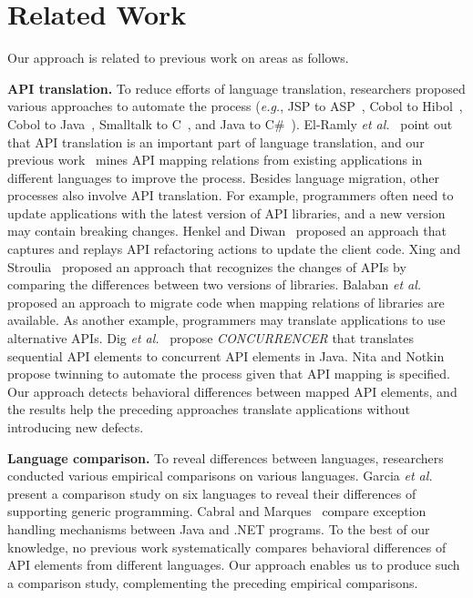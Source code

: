 \section{Related Work}
\label{sec:related}

Our approach is related to previous work on areas as follows.

\textbf{API translation.} To reduce efforts of language translation, researchers proposed various
approaches to automate the process (\emph{e.g.}, JSP to ASP~\cite{hassan2005lightweight}, Cobol to Hibol~\cite{waters1988program}, Cobol to Java~\cite{mossienko2003automated}, Smalltalk to C~\cite{yasumatsu1995spice}, and Java to C\#~\cite{el2006experiment}). El-Ramly \emph{et al.}~\cite{el2006experiment} point out that API translation is an important part of language translation, and our previous work~\cite{zhong2010mining} mines API mapping relations from existing applications in different languages to improve the process. Besides language migration, other processes also involve API translation. For example, programmers often need to update applications with the latest version of API libraries, and a new version may contain breaking changes. Henkel and Diwan~\cite{henkel2005catchup} proposed an approach that captures and replays API refactoring actions to update the client code. Xing and Stroulia~\cite{xing2007api} proposed an approach that recognizes the changes of APIs by comparing the differences between two versions of libraries. Balaban \emph{et al.}~\cite{balaban2005refactoring} proposed an approach to migrate code when mapping relations of libraries are available. As another example, programmers may translate applications to use alternative APIs. Dig \emph{et al.}~\cite{dig2009refactoring} propose \emph{CONCURRENCER} that translates sequential API elements to concurrent API elements in Java. Nita and Notkin~\cite{nita2010using} propose twinning to automate the process given that API mapping is specified. Our approach detects behavioral differences between mapped API elements, and the results help the preceding approaches translate applications without introducing new defects.

\textbf{Language comparison.} To reveal differences between languages, researchers conducted various empirical comparisons on various languages. Garcia \emph{et al.}~\cite{Garcia2003} present a comparison study on six languages to reveal their differences of supporting generic programming. Cabral and Marques~\cite{cabral2007exception} compare exception handling mechanisms between Java and .NET programs. To the best of our knowledge, no previous work systematically compares behavioral differences of API elements from different languages. Our approach enables us to produce such a comparison study, complementing the preceding empirical comparisons.

